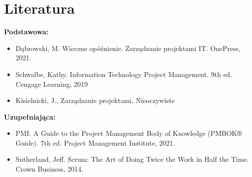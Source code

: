 \documentclass[12pt, a4paper]{article}
\begin{document}
\section{Literatura}

\textbf{Podstawowa:}
\begin{itemize}
  \item Dąbrowski, M. Wieczne opóźnienie. Zarządzanie projektami IT. OnePress, 2021.
  \item Schwalbe, Kathy. Information Technology Project Management. 9th ed. Cengage Learning, 2019
  \item Kisielnicki, J., Zarządzanie projektami, Nieoczywiste
\end{itemize}

\textbf{Uzupełniająca:}
\begin{itemize}
  \item PMI. A Guide to the Project Management Body of Knowledge (PMBOK® Guide). 7th ed. Project Management Institute, 2021.
  \item Sutherland, Jeff. Scrum: The Art of Doing Twice the Work in Half the Time. Crown Business, 2014.
\end{itemize}
\end{document}
